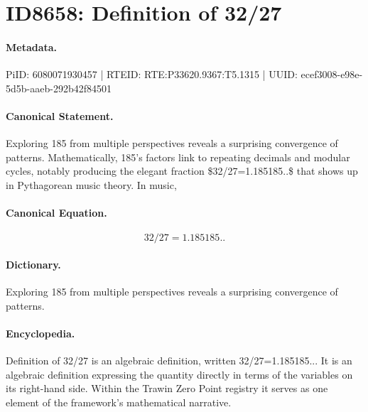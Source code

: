 \section*{ID8658: Definition of 32/27}
\paragraph{Metadata.}
PiID: 6080071930457 | RTEID: RTE:P33620.9367:T5.1315 | UUID: ecef3008-e98e-5d5b-aaeb-292b42f84501

\paragraph{Canonical Statement.}
Exploring 185 from multiple perspectives reveals a surprising convergence of patterns. Mathematically, 185's factors link to repeating decimals and modular cycles, notably producing the elegant fraction \$32/27=1.185185..\$ that shows up in Pythagorean music theory. In music,

\paragraph{Canonical Equation.}
\[
32/27=1.185185..
\]

\paragraph{Dictionary.}
Exploring 185 from multiple perspectives reveals a surprising convergence of patterns.

\paragraph{Encyclopedia.}
Definition of 32/27 is an algebraic definition, written 32/27=1.185185... It is an algebraic definition expressing the quantity directly in terms of the variables on its right-hand side. Within the Trawin Zero Point registry it serves as one element of the framework's mathematical narrative.
